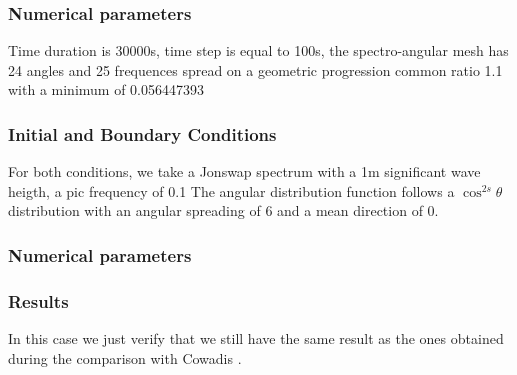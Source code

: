 %
\subsubsection{Numerical parameters}
%
Time duration is 30000s, time step is equal to 100s, the spectro-angular mesh has 24 angles and 25 frequences spread on a geometric progression common ratio 1.1 with a minimum of 0.056447393

\subsubsection{Initial and Boundary Conditions}
%
For both conditions, we take a Jonswap spectrum with a 1m significant wave heigth, a pic frequency of 0.1 The angular distribution function follows a $\cos^{2s} \theta$ distribution with an angular spreading of 6 and a mean direction of 0.

\subsubsection{Numerical parameters}


%
%
\subsubsection{Results}
In this case we just verify that we still have the same result as the ones obtained during the comparison with Cowadis \cite{cowadis}.